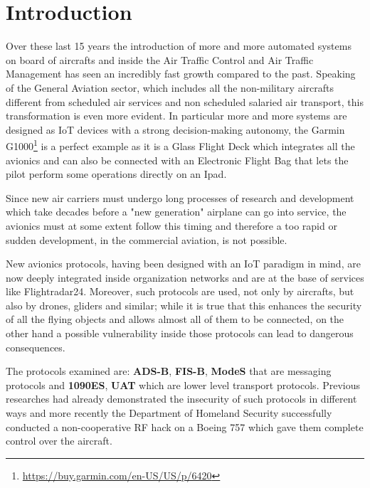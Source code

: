 \documentclass[../main.tex]{subfiles}
\begin{document}
\chapter{Introduction}

Over these last 15 years the introduction of more and more automated systems on board of aircrafts and inside the Air Traffic Control and Air Traffic Management has seen an incredibly fast growth compared to the past. Speaking of the General Aviation sector, which includes all the non-military aircrafts different from scheduled air services and non scheduled salaried air transport, this transformation is even more evident. In particular more and more systems are designed as IoT devices with a strong decision-making autonomy, the Garmin G1000\footnote{\url{https://buy.garmin.com/en-US/US/p/6420}} is a perfect example as it is a Glass Flight Deck which integrates all the avionics and can also be connected with an Electronic Flight Bag that lets the pilot perform some operations directly on an Ipad.

Since new air carriers must undergo long processes of research and development which take decades before a "new generation" airplane can go into service, the avionics must at some extent follow this timing and therefore a too rapid or sudden development, in the commercial aviation, is not possible.

New avionics protocols, having been designed with an IoT paradigm in mind, are now deeply integrated inside organization networks and are at the base of services like Flightradar24. Moreover, such protocols are used, not only by aircrafts, but also by drones, gliders and similar; while it is true that this enhances the security of all the flying objects and allows almost all of them to be connected, on the other hand a possible vulnerability inside those protocols can lead to dangerous consequences.

The protocols examined are: \textbf{ADS-B}, \textbf{FIS-B}, \textbf{ModeS} that are messaging protocols and \textbf{1090ES}, \textbf{UAT} which are lower level transport protocols. Previous researches had already demonstrated the insecurity of such protocols in different ways and more recently the Department of Homeland Security successfully conducted a non-cooperative RF hack on a Boeing 757 which gave them complete control over the aircraft.
\end{document}
